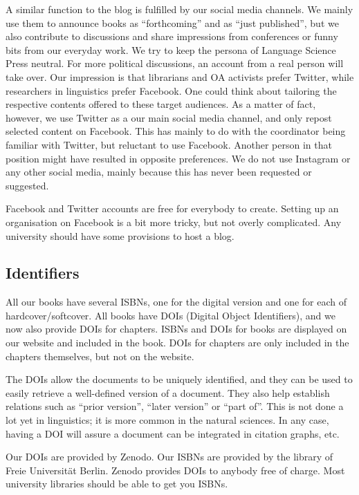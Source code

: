 \documentclass[guidelines,nonflat,modfonts] {langsci/langscibook}
\begin{document}
A similar function to the blog is fulfilled by our social media channels. We mainly use them to announce books as ``forthcoming'' and as ``just published'', but we also contribute to discussions and share impressions from conferences or funny bits from our everyday work. We try to keep the persona of Language Science Press neutral. For more political discussions, an account from a real person will take over. Our impression is that librarians and OA activists prefer Twitter, while researchers in linguistics prefer Facebook. One could think about tailoring the respective contents offered to these target audiences. As a matter of fact, however, we use Twitter as a our main social media channel, and only repost selected content on Facebook. This has mainly to do with the coordinator being familiar with Twitter, but reluctant to use Facebook. Another person in that position might have resulted in opposite preferences. We do not use Instagram or any other social media, mainly because this has never been requested or suggested.

Facebook and Twitter accounts are free for everybody to create. Setting up an organisation on Facebook is a bit more tricky, but not overly complicated. Any university should have some provisions to host a blog.


\subsection{Identifiers}
All our books have several ISBNs, one for the digital version and one for each of hardcover/softcover. All books have DOIs (Digital Object Identifiers), and we now also provide DOIs for chapters. ISBNs and DOIs for books are displayed on our website and included in the book. DOIs for chapters are only included in the chapters themselves, but not on the website. 

The DOIs allow the documents to be uniquely identified, and they can be used to easily retrieve a well-defined version of a document. They also help establish relations such as ``prior version'', ``later version'' or ``part of''. This is not done a lot yet in linguistics; it is more common in the natural sciences. In any case, having a DOI will assure a document can be integrated in citation graphs, etc. 

Our DOIs are provided by Zenodo. Our ISBNs are provided by the library of Freie Universität Berlin. Zenodo provides DOIs to anybody free of charge. Most university libraries should be able to get you ISBNs. 
\end{document}
